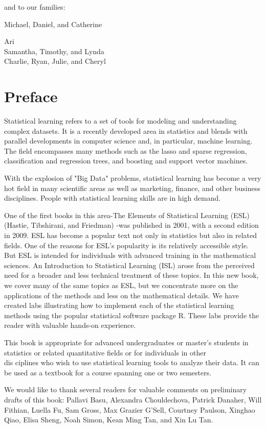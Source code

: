 \documentclass[10pt]{article}
\begin{document}
and to our families:

Michael, Daniel, and Catherine

Ari\\
Samantha, Timothy, and Lynda\\
Charlie, Ryan, Julie, and Cheryl

\section*{Preface}
Statistical learning refers to a set of tools for modeling and understanding complex datasets. It is a recently developed area in statistics and blends with parallel developments in computer science and, in particular, machine learning. The field encompasses many methods such as the lasso and sparse regression, classification and regression trees, and boosting and support vector machines.

With the explosion of "Big Data" problems, statistical learning has become a very hot field in many scientific areas as well as marketing, finance, and other business disciplines. People with statistical learning skills are in high demand.

One of the first books in this area-The Elements of Statistical Learning (ESL) (Hastie, Tibshirani, and Friedman) -was published in 2001, with a second edition in 2009. ESL has become a popular text not only in statistics but also in related fields. One of the reasons for ESL's popularity is its relatively accessible style. But ESL is intended for individuals with advanced training in the mathematical sciences. An Introduction to Statistical Learning (ISL) arose from the perceived need for a broader and less technical treatment of these topics. In this new book, we cover many of the same topics as ESL, but we concentrate more on the applications of the methods and less on the mathematical details. We have created labs illustrating how to implement each of the statistical learning methods using the popular statistical software package R. These labs provide the reader with valuable hands-on experience.

This book is appropriate for advanced undergraduates or master's students in statistics or related quantitative fields or for individuals in other\\
dis
ciplines who wish to use statistical learning tools to analyze their data. It can be used as a textbook for a course spanning one or two semesters.

We would like to thank several readers for valuable comments on preliminary drafts of this book: Pallavi Basu, Alexandra Chouldechova, Patrick Danaher, Will Fithian, Luella Fu, Sam Gross, Max Grazier G'Sell, Courtney Paulson, Xinghao Qiao, Elisa Sheng, Noah Simon, Kean Ming Tan, and Xin Lu Tan.
\end{document}
